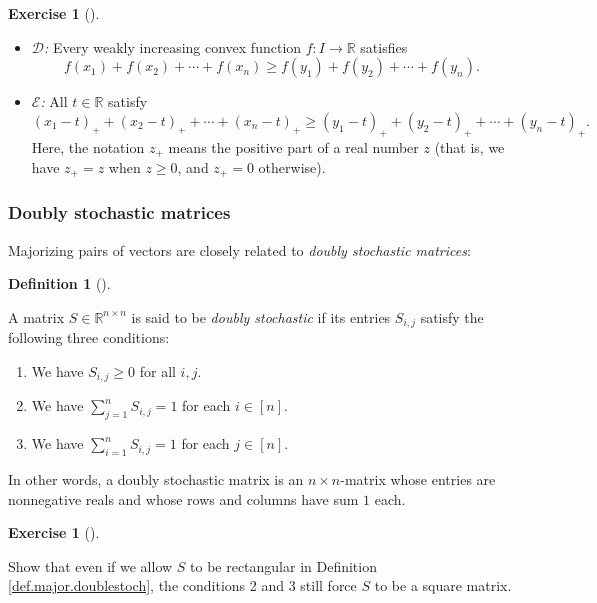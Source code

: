 \documentclass[numbers=enddot,12pt,final,onecolumn,notitlepage]{scrartcl}%
\newcounter{exer}
\numberwithin{exer}{subsection}
\theoremstyle{definition}
\newtheorem{defi}[theo]{Definition}
\newenvironment{definition}[1][]
{\begin{defi}[#1]\begin{leftbar}}
{\end{leftbar}\end{defi}}
\newtheorem{exmp}[exer]{Exercise}
\newenvironment{exercise}[1][]
{\begin{exmp}[#1]\begin{leftbar}}
{\end{leftbar}\end{exmp}}
\let\sumnonlimits\sum
\renewcommand{\sum}{\sumnonlimits\limits}
\begin{document}
\begin{exercise}
\begin{itemize}
\item $\mathcal{D}$\textit{:} Every weakly increasing convex function
$f:I\rightarrow\mathbb{R}$ satisfies%
\[
f\left(  x_{1}\right)  +f\left(  x_{2}\right)  +\cdots+f\left(  x_{n}\right)
\geq f\left(  y_{1}\right)  +f\left(  y_{2}\right)  +\cdots+f\left(
y_{n}\right)  .
\]


\item $\mathcal{E}$\textit{:} All $t\in\mathbb{R}$ satisfy%
\[
\left(  x_{1}-t\right)  _{+}+\left(  x_{2}-t\right)  _{+}+\cdots+\left(
x_{n}-t\right)  _{+}\geq\left(  y_{1}-t\right)  _{+}+\left(  y_{2}-t\right)
_{+}+\cdots+\left(  y_{n}-t\right)  _{+}.
\]
Here, the notation $z_{+}$ means the positive part of a real number $z$ (that
is, we have $z_{+}=z$ when $z\geq0$, and $z_{+}=0$ otherwise).
\end{itemize}
\end{exercise}

\subsubsection{Doubly stochastic matrices}

Majorizing pairs of vectors are closely related to \emph{doubly stochastic
matrices}:

\begin{definition}
\label{def.major.doublestoch}A matrix $S\in\mathbb{R}^{n\times n}$ is said to
be \emph{doubly stochastic} if its entries $S_{i,j}$ satisfy the following
three conditions:

\begin{enumerate}
\item We have $S_{i,j}\geq0$ for all $i,j$.

\item We have $\sum_{j=1}^{n}S_{i,j}=1$ for each $i\in\left[  n\right]  $.

\item We have $\sum_{i=1}^{n}S_{i,j}=1$ for each $j\in\left[  n\right]  $.
\end{enumerate}
\end{definition}

In other words, a doubly stochastic matrix is an $n\times n$-matrix whose
entries are nonnegative reals and whose rows and columns have sum $1$ each.

\begin{exercise}
\label{exe.major.doublestoch.square} Show that even if we allow $S$ to
be rectangular in Definition \ref{def.major.doublestoch}, the conditions 2 and
3 still force $S$ to be a square matrix.
\end{exercise}
\end{document}
